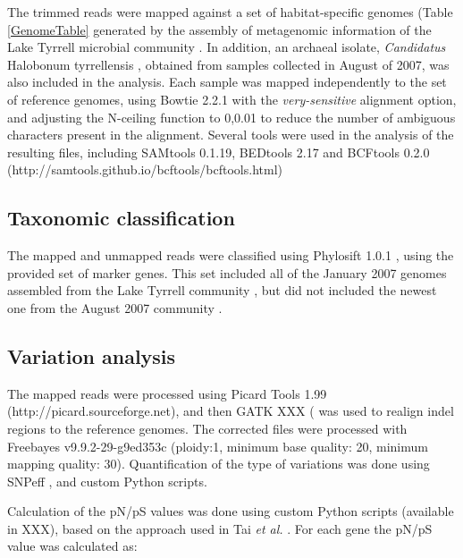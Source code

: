 The trimmed reads were mapped against a set of habitat-specific genomes (Table \ref{GenomeTable} generated by the assembly of metagenomic information of the Lake Tyrrell microbial community \cite{Narasingarao:2012kp,Podell:2013kx,Podell:2013fp}. In addition, an archaeal isolate, \textit{Candidatus} Halobonum tyrrellensis \cite{Ugalde:2013hb}, obtained from samples collected in August of 2007, was also included in the analysis. Each sample was mapped independently to the set of reference genomes, using Bowtie 2.2.1 \cite{Langmead:2012jh} with the \textit{very-sensitive} alignment option, and adjusting the N-ceiling function to 0,0.01 to reduce the number of ambiguous characters present in the alignment. Several tools were used in the analysis of the resulting files, including SAMtools 0.1.19\cite{Li:2009ka}, BEDtools 2.17 \cite{Quinlan:2010km} and BCFtools 0.2.0 (http://samtools.github.io/bcftools/bcftools.html)

\subsection{Taxonomic classification}

The mapped and unmapped reads were classified using Phylosift 1.0.1 \cite{Darling:2014ej}, using the provided set of marker genes. This set included all of the January 2007 genomes assembled from the Lake Tyrrell community \cite{Narasingarao:2012kp,Podell:2013kx}, but did not included the newest one from the August 2007 community \cite{Podell:2013fp}.

\subsection{Variation analysis}

The mapped reads were processed using Picard Tools 1.99 (http://picard.sourceforge.net), and then GATK XXX (\cite{DePristo:2011fo} was used to realign indel regions to the reference genomes. The corrected files were processed with Freebayes v9.9.2-29-g9ed353c \cite{Garrison:2012wb} (ploidy:1, minimum base quality: 20, minimum mapping quality: 30). Quantification of the type of variations was done using SNPeff \cite{Cingolani:2012cz}, and custom Python scripts. 

Calculation of the pN/pS values was done using custom Python scripts (available in XXX), based on the approach used in Tai \textit{et al.} \cite{Tai:2011jo}. For each gene the pN/pS value was calculated as:

\begin{center}
\end{center}

